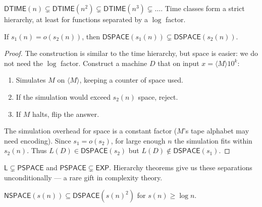 \begin{corollary}
$\mathsf{DTIME}(n) \subsetneq \mathsf{DTIME}(n^2) \subsetneq \mathsf{DTIME}(n^3) \subsetneq \dots$. Time classes form a strict hierarchy, at least for functions separated by a $\log$ factor.
\end{corollary}

\begin{theorem}
If $s_1(n) = o(s_2(n))$, then $\mathsf{DSPACE}(s_1(n)) \subsetneq \mathsf{DSPACE}(s_2(n))$.
\end{theorem}

\begin{proof}
The construction is similar to the time hierarchy, but space is easier: we do not need the $\log$ factor. Construct a machine $D$ that on input $x = \langle M \rangle 10^k$:
\begin{enumerate}
\item Simulates $M$ on $\langle M \rangle$, keeping a counter of space used.
\item If the simulation would exceed $s_2(n)$ space, reject.
\item If $M$ halts, flip the answer.
\end{enumerate}
The simulation overhead for space is a constant factor ($M$'s tape alphabet may need encoding). Since $s_1 = o(s_2)$, for large enough $n$ the simulation fits within $s_2(n)$. Thus $L(D) \in \mathsf{DSPACE}(s_2)$ but $L(D) \notin \mathsf{DSPACE}(s_1)$.
\end{proof}

\begin{corollary}
$\mathsf{L} \subsetneq \mathsf{PSPACE}$ and $\mathsf{PSPACE} \subsetneq \mathsf{EXP}$. Hierarchy theorems give us these separations unconditionally — a rare gift in complexity theory.
\end{corollary}

\begin{theorem}
$\mathsf{NSPACE}(s(n)) \subseteq \mathsf{DSPACE}(s(n)^2)$ for $s(n) \ge \log n$.
\end{theorem}

